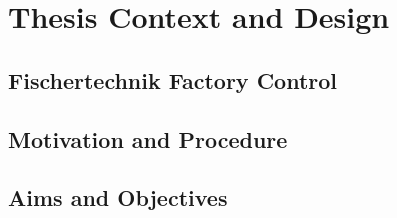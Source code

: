 \chapter{Thesis Context and Design }
\section{Fischertechnik Factory Control}
\section{Motivation and Procedure}
\section{Aims and Objectives}